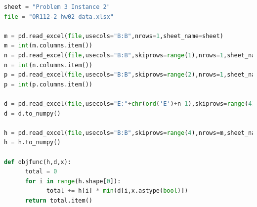 \documentclass[12pt]{article}
\begin{document}
\begin{enumerate}
\begin{enumerate}
\begin{lstlisting}[language=Python]
sheet = "Problem 3 Instance 2"
file = "OR112-2_hw02_data.xlsx"

m = pd.read_excel(file,usecols="B:B",nrows=1,sheet_name=sheet)
m = int(m.columns.item())
n = pd.read_excel(file,usecols="B:B",skiprows=range(1),nrows=1,sheet_name=sheet)
n = int(n.columns.item())
p = pd.read_excel(file,usecols="B:B",skiprows=range(2),nrows=1,sheet_name=sheet)
p = int(p.columns.item())

d = pd.read_excel(file,usecols="E:"+chr(ord('E')+n-1),skiprows=range(4),nrows=m,sheet_name=sheet)
d = d.to_numpy()

h = pd.read_excel(file,usecols="B:B",skiprows=range(4),nrows=m,sheet_name=sheet)
h = h.to_numpy()

def objfunc(h,d,x):
      total = 0
      for i in range(h.shape[0]):
            total += h[i] * min(d[i,x.astype(bool)])
      return total.item()


\end{lstlisting}
\end{enumerate}
\end{enumerate}
\end{document}
